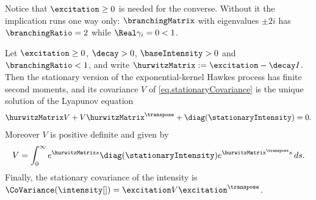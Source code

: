 \begin{remark}\label{remark.hurwitzNeedsNonNegativity}
 Notice that $\excitation \geq 0$ is needed for the converse.
 Without it the implication runs one way only:
 $\branchingMatrix$ with eigenvalues $\pm 2i$ has $\branchingRatio = 2$
 while $\Real\gamma_i = 0 < 1$.
\end{remark}

\begin{thm}\label{thm.lyapunov}
 Let $\excitation \geq 0$, $\decay > 0$, $\baseIntensity > 0$ and $\branchingRatio < 1$,
 and write $\hurwitzMatrix := \excitation - \decay I$.
 Then the stationary version of the exponential-kernel Hawkes process has finite second
 moments, and its covariance $V$ of \eqref{eq.stationaryCovariance} is the unique solution
 of the Lyapunov equation
 \begin{equation}\label{eq.lyapunov}
  \hurwitzMatrix V + V \hurwitzMatrix^{\transpose} + \diag(\stationaryIntensity) = 0 .
 \end{equation}
 Moreover $V$ is positive definite and given by
 \begin{equation}\label{eq.explicitFormulaeOfStationaryCovariance}
  V = \int_{0}^{\infty} e^{\hurwitzMatrix s} \diag(\stationaryIntensity)
  e^{\hurwitzMatrix^{\transpose} s} \, ds .
 \end{equation}
 Finally, the stationary covariance of the intensity is
 $\CoVariance(\intensity[ ]) = \excitation V \excitation^{\transpose}$.
\end{thm}
